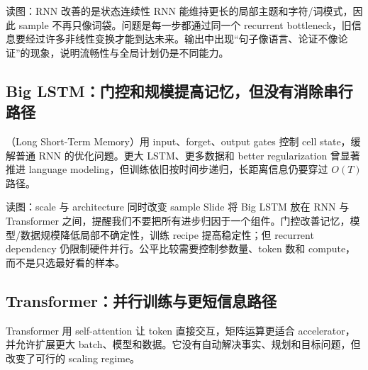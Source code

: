
\begin{knowledgebox}{读图：RNN 改善的是状态连续性}
RNN 能维持更长的局部主题和字符/词模式，因此 sample 不再只像词袋。问题是每一步都通过同一个 recurrent bottleneck，旧信息要经过许多非线性变换才能到达未来。输出中出现“句子像语言、论证不像论证”的现象，说明流畅性与全局计划仍是不同能力。
\end{knowledgebox}


\subsection{Big LSTM：门控和规模提高记忆，但没有消除串行路径}

（Long Short-Term Memory）用 input、forget、output gates 控制 cell state，缓解普通 RNN 的优化问题。更大 LSTM、更多数据和 better regularization 曾显著推进 language modeling，但训练依旧按时间步递归，长距离信息仍要穿过 $O(T)$ 路径。


\begin{knowledgebox}{读图：scale 与 architecture 同时改变 sample}
Slide 将 Big LSTM 放在 RNN 与 Transformer 之间，提醒我们不要把所有进步归因于一个组件。门控改善记忆，模型/数据规模降低局部不确定性，训练 recipe 提高稳定性；但 recurrent dependency 仍限制硬件并行。公平比较需要控制参数量、token 数和 compute，而不是只选最好看的样本。
\end{knowledgebox}

\subsection{Transformer：并行训练与更短信息路径}

Transformer 用 self-attention 让 token 直接交互，矩阵运算更适合 accelerator，并允许扩展更大 batch、模型和数据。它没有自动解决事实、规划和目标问题，但改变了可行的 scaling regime。



